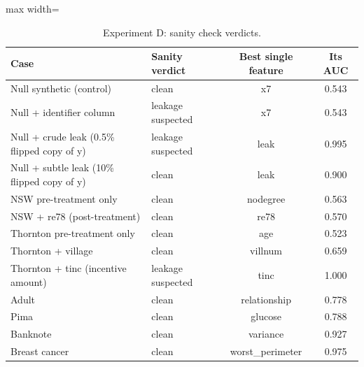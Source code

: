 \begin{table}[!t]
\centering
\caption{Experiment D: sanity check verdicts.}
\label{tab:sanity}
\footnotesize
\begin{adjustbox}{max width=\linewidth}
\begin{tabular}{llcc}
\hline
Case & Sanity verdict & Best single feature & Its AUC \\ \hline
Null synthetic (control) & clean & x7 & 0.543 \\
Null + identifier column & leakage suspected & x7 & 0.543 \\
Null + crude leak (0.5\% flipped copy of y) & leakage suspected & leak & 0.995 \\
Null + subtle leak (10\% flipped copy of y) & clean & leak & 0.900 \\
NSW pre-treatment only & clean & nodegree & 0.563 \\
NSW + re78 (post-treatment) & clean & re78 & 0.570 \\
Thornton pre-treatment only & clean & age & 0.523 \\
Thornton + village & clean & villnum & 0.659 \\
Thornton + tinc (incentive amount) & leakage suspected & tinc & 1.000 \\
Adult & clean & relationship & 0.778 \\
Pima & clean & glucose & 0.788 \\
Banknote & clean & variance & 0.927 \\
Breast cancer & clean & worst\_perimeter & 0.975 \\
\hline
\end{tabular}
\end{adjustbox}
\end{table}
